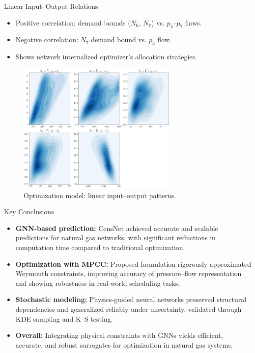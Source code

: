 \documentclass[hyperref={colorlinks,citecolor=blue,linkcolor=blue,urlcolor=blue}]{beamer}
\begin{document}
\begin{frame}{Linear Input--Output Relations}
    \begin{itemize}
        \item Positive correlation: demand bounds ($N_6$, $N_7$) vs. $p_4$--$p_7$ flows.
        \item Negative correlation: $N_7$ demand bound vs. $p_3$ flow.
        \item Shows network internalized optimizer’s allocation strategies.
    \end{itemize}
    \begin{figure}
        \includegraphics[width=0.7\textwidth]{figures/inputs_outputs_2.png}
        \caption*{Optimization model: linear input–output patterns.}
    \end{figure}
\end{frame}


\begin{frame}{Key Conclusions}
    \begin{itemize}
        \item \textbf{GNN-based prediction:} CensNet achieved accurate and scalable predictions for natural gas networks, with significant reductions in computation time compared to traditional optimization.
        \item \textbf{Optimization with MPCC:} Proposed formulation rigorously approximated Weymouth constraints, improving accuracy of pressure–flow representation and showing robustness in real-world scheduling tasks.
        \item \textbf{Stochastic modeling:} Physics-guided neural networks preserved structural dependencies and generalized reliably under uncertainty, validated through KDE sampling and K–S testing.
        \item \textbf{Overall:} Integrating physical constraints with GNNs yields efficient, accurate, and robust surrogates for optimization in natural gas systems.
    \end{itemize}
\end{frame}
\end{document}
